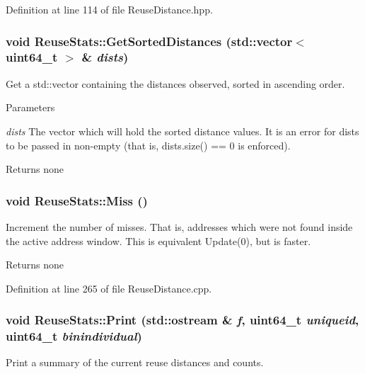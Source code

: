Definition at line 114 of file ReuseDistance.hpp.\hypertarget{class_reuse_stats_adcb657e303c090ac5ef210f6c4506986}{
\subsubsection[{GetSortedDistances}]{\setlength{\rightskip}{0pt plus 5cm}void ReuseStats::GetSortedDistances (std::vector$<$ uint64\_\-t $>$ \& {\em dists})}}
\label{class_reuse_stats_adcb657e303c090ac5ef210f6c4506986}
Get a std::vector containing the distances observed, sorted in ascending order.


\begin{DoxyParams}{Parameters}
\item[{\em dists}]The vector which will hold the sorted distance values. It is an error for dists to be passed in non-\/empty (that is, dists.size() == 0 is enforced).\end{DoxyParams}
\begin{DoxyReturn}{Returns}
none 
\end{DoxyReturn}
\hypertarget{class_reuse_stats_a3d963a3b6c2c0b37b23d4e0723a70831}{
\subsubsection[{Miss}]{\setlength{\rightskip}{0pt plus 5cm}void ReuseStats::Miss ()}}
\label{class_reuse_stats_a3d963a3b6c2c0b37b23d4e0723a70831}
Increment the number of misses. That is, addresses which were not found inside the active address window. This is equivalent Update(0), but is faster.

\begin{DoxyReturn}{Returns}
none 
\end{DoxyReturn}


Definition at line 265 of file ReuseDistance.cpp.\hypertarget{class_reuse_stats_a950e46c58818c5afda7038f7345421d6}{
\subsubsection[{Print}]{\setlength{\rightskip}{0pt plus 5cm}void ReuseStats::Print (std::ostream \& {\em f}, \/  uint64\_\-t {\em uniqueid}, \/  uint64\_\-t {\em binindividual})}}
\label{class_reuse_stats_a950e46c58818c5afda7038f7345421d6}
Print a summary of the current reuse distances and counts.


